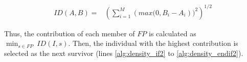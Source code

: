 \begin{equation} \label{eq:ImprovementDistance}
\begin{split}
 ID(A, B) = &  \left (\sum_{i=1}^M \left (max(0, B_i - A_i \right ))^2  \right)^{1/2}
\end{split}
\end{equation}

Thus, the contribution of each member of $FP$ is calculated as $\displaystyle{\min_{s \in FP}\ ID(I, s)}$.
%
Then, the individual with the highest contribution is selected as the next survivor (lines \ref{alg:density_if2} to \ref{alg:density_endif2}).%



%
%
%
%

%
%

